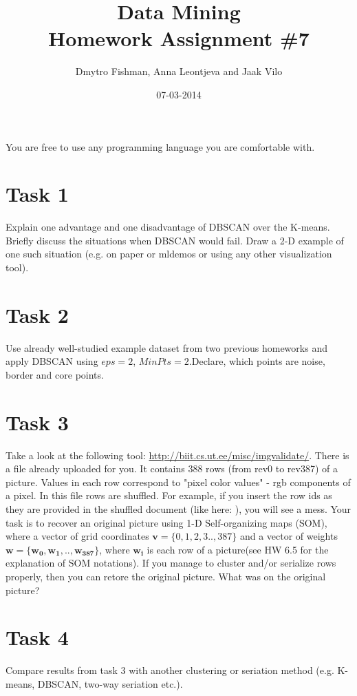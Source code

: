 \documentclass{article}
\title{Data Mining\\Homework Assignment \#7} %
\author{Dmytro Fishman, Anna Leontjeva and Jaak Vilo} %
\date{07-03-2014} %
\begin{document}
\maketitle %

You are free to use any programming language you are comfortable with. 

\section*{Task 1}
Explain one advantage and one disadvantage of DBSCAN over the K-means. Briefly discuss the situations when DBSCAN would fail. Draw a 2-D example of one such situation (e.g. on paper or mldemos or using any other visualization tool).
\section*{Task 2}
Use already well-studied example dataset from two previous homeworks and apply DBSCAN using $eps=2$, $MinPts=2$.Declare, which points are noise, border and core points. 

\section*{Task 3}
Take a look at the following tool: \url{http://biit.cs.ut.ee/misc/imgvalidate/}. There is a file already uploaded for you. It contains 388 rows (from rev0 to rev387) of a picture. Values in each row correspond to "pixel color values" - rgb components of a pixel. In this file rows are shuffled. For example, if you insert the row ids as they are provided in the shuffled document (like here: ), you will see a mess. Your task is to recover an original picture using 1-D Self-organizing maps (SOM), where a vector of grid coordinates $\mathbf{v} = \{0,1,2,3..,387\}$ and a vector of weights $\mathbf{w} = \{\boldsymbol{w_0,w_1,..,w_{387}}\}$, 
where $\boldsymbol{w_i}$ is each row of a picture(see HW 6.5 for the explanation of SOM notations).
If you manage to cluster and/or serialize rows properly, then you can retore the original picture. What was on the original picture?

\section*{Task 4}
Compare results from task 3 with another clustering or seriation method (e.g. K-means, DBSCAN, two-way seriation etc.).
\end{document}

